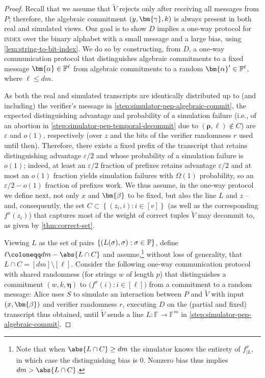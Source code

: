 \documentclass[10pt,a4paper]{article}
\theoremstyle{definition}
\newcommand{\field}{\mathbb{F}}
\renewcommand{\set}[1]{\left\{#1\right\}}
\newcommand{\eps}{\varepsilon}
\newcommand{\indexproblem}{\normalfont\textsc{index}\xspace}
\newcommand{\vcommitlength}{v}
\newcommand{\vcommitstring}{z}
\newcommand{\pcommitlength}{p}
\newcommand{\pcommitstring}{y}
\newcommand{\dimension}{m}
\newcommand{\degree}{d}
\newcommand{\evaluationpoint}{\bm{\fe2}}
\newcommand{\fingerprinttuple}{\bm{\rho}}
\renewcommand{\line}{L}
\def\fe#1{
    \ifnum#1=1
        \alpha
    \else
    \ifnum#1=2
        \beta
    \else
    \ifnum#1=3
        \gamma
    \fi\fi\fi
}
\def\rfe#1{
    \ifnum#1=1
        \rho
    \else
    \ifnum#1=2
        \sigma
    \else
    \fi\fi
}
\begin{document}
\begin{proof}
    Recall that we assume that $\widetilde V$ rejects only after receiving all messages from $P$; therefore, the algebraic commitment $(\pcommitstring, \bm{\fe3}, k)$ is always present in both real and simulated views. Our goal is to show $D$ implies a one-way protocol for \indexproblem over the binary alphabet with a small message and a large bias, using \cref{lem:string-to-bit-index}. We do so by constructing, from $D$, a one-way communication protocol that distinguishes algebraic commitments to a fixed message $\bm{\fe1} \in \field^\ell$ from algebraic commitments to a random $\bm{\fe1}' \in \field^\ell$, where $\ell \leq \degree \dimension$.
    
    As both the real and simulated transcripts are identically distributed up to (and including) the verifier's message in \cref{step:simulator-pep-algebraic-commit}, the expected distinguishing advantage and probability of a simulation failure (i.e., of an abortion in \cref{step:simulator-pep-temporal-decommit} due to $(\fingerprinttuple, \ell) \notin C$) are $\eps$ and $o(1)$, respectively (over $\vcommitstring$ and the bits of the verifier randomness $r$ used until then). Therefore, there exists a fixed prefix of the transcript that retains distinguishing advantage $\eps/2$ and whose probability of a simulation failure is $o(1)$; indeed, at least an $\eps/2$ fraction of prefixes retains advantage $\eps/2$ and at most an $o(1)$ fraction yields simulation failures with $\Omega(1)$ probability, so an $\eps/2 - o(1)$ fraction of prefixes work. We thus assume, in the one-way protocol we define next, not only $x$ and $\evaluationpoint$ to be fixed, but also the line $\line$ and $\vcommitstring$ -- and, consequently, the set $C \subset \set{(\vcommitstring_i, i) : i \in [\vcommitlength]}$ (as well as the corresponding $f^x(\vcommitstring_i)$) that captures most of the weight of correct tuples $\widetilde V$ may decommit to, as given by \cref{thm:correct-set}.

    Viewing $\line$ as the set of pairs $\set{(\line(\rfe2), \rfe2) : \rfe2 \in \field}$, define $\ell \coloneqq \degree\dimension - \abs{\line \cap C}$ and assume,\footnote{Note that when $\abs{\line \cap C} \geq \degree\dimension$ the simulator knows the entirety of $f^x_{|\line}$, in which case the distinguishing bias is $0$. Nonzero bias thus implies $\degree\dimension > \abs{\line \cap C}$.} without loss of generality, that $\line \cap C = [\degree\dimension] \setminus [\ell]$.
    Consider the following one-way communication protocol with shared randomness (for strings $w$ of length $\pcommitlength$) that distinguishes a commitment $(w, k, \bm{\eta})$ to $\big(f^x(i) : i \in [\ell]\big)$ from a commitment to a random message: Alice uses $S$ to simulate an interaction between $P$ and $\widetilde V$ with input $(x, \evaluationpoint)$ and verifier randomness $r$, executing $D$ on the (partial and fixed) transcript thus obtained, until $\widetilde V$ sends a line $\line: \field \to \field^\dimension$ in \cref{step:simulator-pep-algebraic-commit}.
    

\end{proof}
\end{document}
